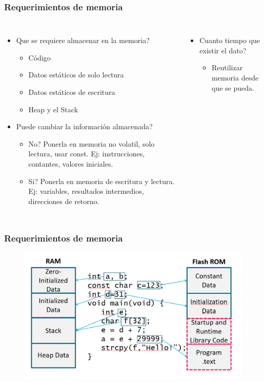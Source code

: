 \documentclass[10.5pt,scale=1.0,t,aspectratio=169,hyperref={pdfpagelabels=false}]{beamer}
\begin{document}
\begin{frame}
	\frametitle{Requerimientos de memoria}
		\begin{columns}
	 	\begin{itemize}
	 		\item Que se requiere almacenar en la memoria?
	 		\begin{itemize}
	 			\item Código
	 			\item Datos estáticos de solo lectura
	 			\item Datos estáticos de escritura
	 			\item Heap y el Stack
	 		\end{itemize}
 			\item Puede cambiar la información almacenada?
 			\begin{itemize}
 				\item No? Ponerla en memoria no volatil, solo lectura, usar const. Ej: instrucciones, contantes, valores iniciales.
 				\item Si? Ponerla en memoria de escritura y lectura. Ej: variables, resultados intermedios, direcciones de retorno. 
 			\end{itemize}
	 	\end{itemize}
		
		\begin{itemize}
			\item Cuanto tiempo que existir el dato?
			\begin{itemize}
				\item Reutilizar memoria desde que se pueda. 
			\end{itemize}
		\end{itemize}
	\end{columns}
\end{frame}

\begin{frame}
	\frametitle{Requerimientos de memoria}
	\begin{figure}
		\centering
		\includegraphics[scale=0.45]{ExampleMemory}
	\end{figure}
\end{frame}
\end{document}
